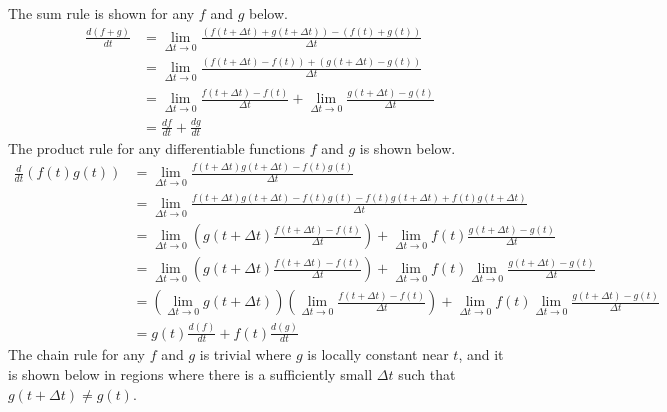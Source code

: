 \begin{answer}[Differentiation]
	The sum rule is shown for any $f$ and $g$ below.
	\begin{align*}
		\frac{d(f+g)}{dt} & =
		\lim_{\Delta t \to 0} \frac{\left(f(t+\Delta t)+g(t+\Delta t)\right)-\left(f(t)+g(t)\right)}{\Delta t}                                      \\
		                  & = \lim_{\Delta t \to 0} \frac{\left(f(t+\Delta t)-f(t)\right)+\left(g(t+\Delta t)-g(t)\right)}{\Delta t}                \\
		                  & = \lim_{\Delta t \to 0} \frac{f(t+\Delta t)-f(t)}{\Delta t} + \lim_{\Delta t \to 0} \frac{g(t+\Delta t)-g(t)}{\Delta t} \\
		                  & = \frac{df}{dt} + \frac{dg}{dt}
	\end{align*}
	The product rule for any differentiable functions $f$ and $g$ is shown below.
	\begin{align*}
		\frac{d}{dt}\left(f(t) g(t)\right)
		 & = \lim_{\Delta t \to 0} \frac{f(t+\Delta t) g(t+\Delta t) - f(t)g(t)}{\Delta t}                                                                                                                                        \\
		 & = \lim_{\Delta t \to 0} \frac{f(t+\Delta t) g(t+\Delta t) - f(t) g(t) - f(t) g(t+\Delta t) + f(t) g(t+\Delta t)}{\Delta t}                                                                                             \\
		 & = \lim_{\Delta t \to 0} \left(g(t+\Delta t) \frac{f(t+\Delta t) - f(t)}{\Delta t}\right) + \lim_{\Delta t \to 0} f(t) \frac{g(t+\Delta t) - g(t)}{\Delta t}                                                            \\
		 & = \lim_{\Delta t \to 0} \left(g(t+\Delta t) \frac{f(t+\Delta t) - f(t)}{\Delta t}\right) + \lim_{\Delta t \to 0} f(t) \lim_{\Delta t \to 0} \frac{g(t+\Delta t) - g(t)}{\Delta t}                                      \\
		 & = \left(\lim_{\Delta t \to 0} g(t + \Delta t)\right) \left(\lim_{\Delta t \to 0} \frac{f(t+\Delta t) - f(t)}{\Delta t}\right) + \lim_{\Delta t \to 0} f(t) \lim_{\Delta t \to 0} \frac{g(t+\Delta t) - g(t)}{\Delta t} \\
		 & = g(t) \frac{d(f)}{dt} + f(t) \frac{d(g)}{dt}
	\end{align*}
	The chain rule for any $f$ and $g$ is trivial where $g$ is locally constant near $t$, and it is shown below in regions where there is a sufficiently small $\Delta t$ such that $g(t+\Delta t) \neq g(t)$.

\end{answer}
